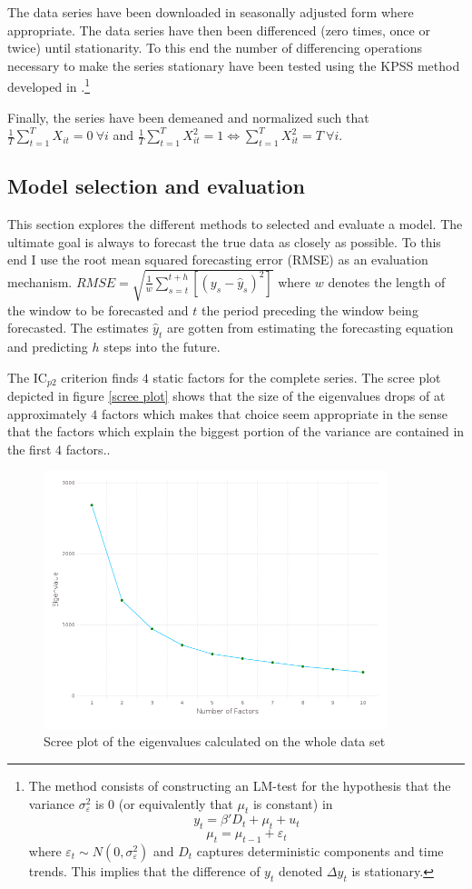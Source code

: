 \documentclass[12pt]{article}
\begin{document}
The data series have been downloaded in seasonally adjusted form where appropriate. The data series have then been differenced (zero times, once or twice) until stationarity. To this end the number of differencing operations necessary to make the series stationary have been tested using the KPSS method developed in \citet{kwiatkowski1992testing}.\footnote{The method consists of constructing an LM-test for the hypothesis that the variance $\sigma^2_\varepsilon$ is 0 (or equivalently that $\mu_t$ is constant) in $$y_t = \beta'D_t + \mu_t + u_t$$ $$\mu_t = \mu_{t-1} + \varepsilon_t$$ where $\varepsilon_t \sim N(0, \sigma^2_\varepsilon)$ and $D_t$ captures deterministic components and time trends. This implies that the difference of $y_t$ denoted $\Delta y_t$ is stationary.}

Finally, the series have been demeaned and normalized such that $\frac{1}{T}\sum_{t=1}^T X_{it} = 0 \ \forall i$ and $\frac{1}{T}\sum_{t=1}^T X_{it}^2 = 1 \Leftrightarrow \sum_{t=1}^T X_{it}^2 = T \ \forall i$. \\


\subsection{Model selection and evaluation}
This section explores the different methods to selected and evaluate a model. The ultimate goal is always to forecast the true data as closely as possible. To this end I use the root mean squared forecasting error (RMSE) as an evaluation mechanism. $RMSE = \sqrt{\frac{1}{w}\sum_{s=t}^{t+h}[(y_s - \hat y_s)^2]}$ where $w$ denotes the length of the window to be forecasted and $t$ the period preceding the window being forecasted. The estimates $\hat y_t$ are gotten from estimating the forecasting equation and predicting $h$ steps into the future.

The IC$_{p2}$ criterion finds $4$ static factors for the complete series. The scree plot depicted in figure \ref{scree plot} shows that the size of the eigenvalues drops of at approximately $4$ factors which makes that choice seem appropriate in the sense that the factors which explain the biggest portion of the variance are contained in the first $4$ factors..

\begin{figure}[htp]
\centering
\includegraphics[width=10cm]{graphs/screeplot.png}
\caption{Scree plot of the eigenvalues calculated on the whole data set}
\label{screeplot}
\end{figure}
\end{document}
